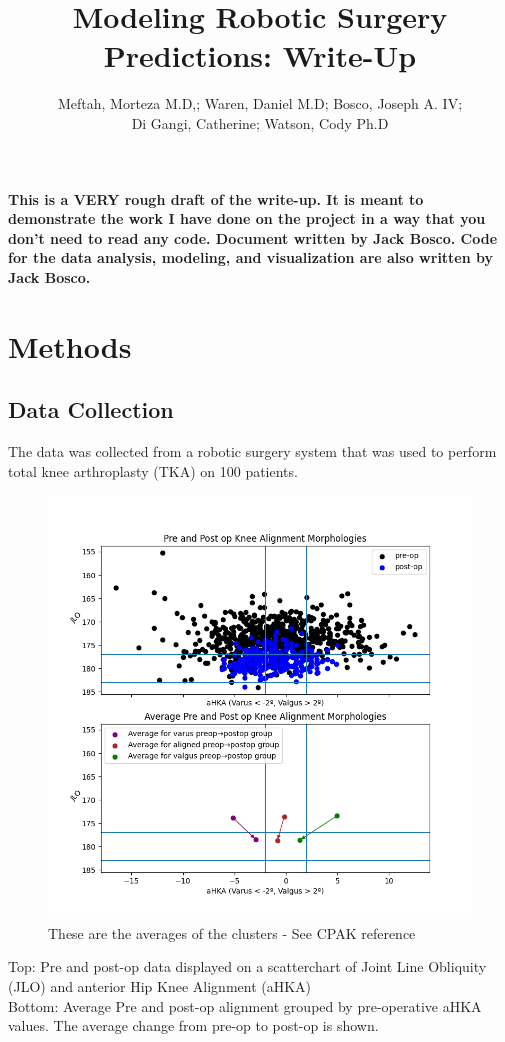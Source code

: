 \documentclass{article}
\author{Meftah, Morteza M.D,; Waren, Daniel M.D; Bosco, Joseph A. IV;\\
Di Gangi, Catherine; Watson, Cody Ph.D}
\title{Modeling Robotic Surgery Predictions: Write-Up}
\begin{document}
\maketitle

\textbf{%
This is a VERY rough draft of the write-up. 
It is meant to demonstrate the work I have done on the project in a way that you don't need to read any code.
Document written by Jack Bosco. 
Code for the data analysis, modeling, and visualization are also written by Jack Bosco. 
}

\section{Methods}

\subsection{Data Collection}

The data was collected from a robotic surgery system that was used to perform total knee arthroplasty (TKA) on 100 patients.


\newpage

\begin{figure}[t]
\includegraphics[width=.9\textwidth]{data_vis.png}
\caption{These are the averages of the clusters - See CPAK reference}
\end{figure}

Top: Pre and post-op data displayed on a scatterchart of Joint Line Obliquity (JLO) and anterior Hip Knee Alignment (aHKA)\\
Bottom: Average Pre and post-op alignment grouped by pre-operative aHKA values.
The average change from pre-op to post-op is shown.
\end{document}
